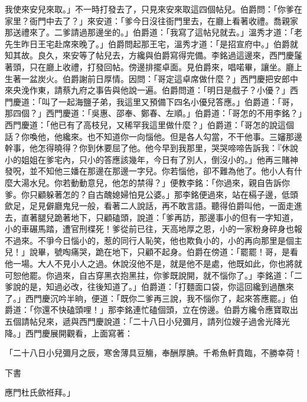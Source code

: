 我使來安兒來取。」不一時打發去了，只見來安來取這四個帖兒。伯爵問：「你爹在家里？衙門中去了？」來安道：「爹今日沒往衙門里去，在廳上看著收禮。喬親家那送禮來了。二爹請過那邊坐的。」伯爵道：「我寫了這帖兒就去。」溫秀才道：「老先生昨日王宅赴席來晚了。」伯爵問起那王宅，溫秀才道：「是招宣府中。」伯爵就知其故。良久，來安等了帖兒去，方纔與伯爵寫得完備。李銘過這邊來，西門慶鬔著頭，只在廳上收禮，打發回帖。傍邊排擺卓面。見伯爵來，唱喏畢，讓坐。廳上生著一盆炭火。伯爵謝前日厚情。因問：「哥定這卓席做什麼？」西門慶把安郎中來央浼作東，請蔡九府之事告與他說一遍。伯爵問道：「明日是戲子？小優？」西門慶道：「叫了一起海鹽子弟，我這里又預備下四名小優兒答應。」伯爵道：「哥，那四個？」西門慶道：「吳惠、邵奉、鄭春、左順。」伯爵道：「哥怎的不用李銘？」西門慶道：「他已有了高枝兒，又稀罕我這里做什麼？」伯爵道：「哥怎的說這個話？你喚他，他纔來。也不知道你一向惱他。但是各人勾當，不干他事。三嬸那邊幹事，他怎得曉得？你到休要屈了他。他今早到我那里，哭哭啼啼告訴我：『休說小的姐姐在爹宅內，只小的答應該幾年，今日有了別人，倒沒小的。」他再三賭神發呪，並不知他三嬏在那邊在那邊一字兒。你若惱他，卻不難為他了。他小人有什麼大湯水兒。你若動動意兒，他怎的禁得？」便教李銘：「你過來，親自告訴你爹。你只顧躲著怎的？自古醜媳婦怕見公婆。」那李銘便過來，站在槅子邊，低頭歛足，足見僻廳鬼兒一般，看著二人說話，再不敢言語。聽得伯爵叫他，一面走進去，直著腿兒跪著地下，只顧磕頭，說道：「爹再訪，那邊事小的但有一字知道，小的車碾馬踏，遭官刑楪死！爹從前已往，天高地厚之恩，小的一家粉身碎身也報不過來。不爭今日惱小的，惹的同行人恥笑，他也欺負小的，小的再向那里是個主兒！」說畢，號啕痛哭，跪在地下，只顧不起身。伯爵在傍道：「罷罷！哥，是看他一場。大人不見小人之過。休說沒他不是，就是他不是處，他既如此，你也將就可恕他罷。你過來，自古穿黑衣抱黑拄，你爹既說開，就不惱你了。」李銘道：「二爹說的是，知過必改，往後知道了。」伯爵道：「打麵面口袋，你這回纔到過醮來了。」西門慶沉吟半晌，便道：「既你二爹再三說，我不惱你了，起來答應罷。」伯爵道：「你還不快磕頭哩！」那李銘連忙磕個頭，立在傍邊。伯爵方纔令應寶取出五個請帖兒來，遞與西門慶說道：「二十八日小兒彌月，請列位嫂子過舍光降光降。」西門慶展開觀看，上面寫著：

「二十八日小兒彌月之辰，寒舍薄具豆觴，奉酬厚腆。千希魚軒賁臨，不勝幸荷！

下書

應門杜氏歛袵拜。」

